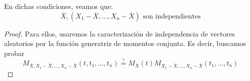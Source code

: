 \begin{prop}
    En dichas condiciones, veamos que:
    \begin{equation*}
        \overline{X}, (X_1 - \overline{X}, \ldots, X_n - \overline{X}) \text{\ son independientes}
    \end{equation*}
    \begin{proof}
        Para ellos, usaremos la caracterización de independencia de vectores aleatorios por la función generatriz de momentos conjunta. Es decir, buscamos probar
        \begin{equation*}
            M_{\overline{X},X_1 - \overline{X}, \ldots, X_n - \overline{X}}(t,t_1, \ldots, t_n) \stackrel{\text{?}}{=} M_{\overline{X}}(t) M_{X_1 - \overline{X}, \ldots, X_n - \overline{X}}(t_1, \ldots, t_n)
        \end{equation*}


\end{proof}
\end{prop}
